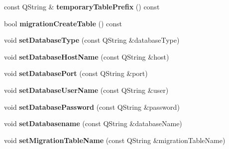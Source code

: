 \begin{DoxyCompactItemize}
const Q\+String \& {\bfseries temporary\+Table\+Prefix} () const
\item 
\mbox{\label{class_q_sql_migrator_1_1_q_sql_migrator_config_a8f70fad7d7e0b80be87b8756aa73f079}} 
bool {\bfseries migration\+Create\+Table} () const
\item 
\mbox{\label{class_q_sql_migrator_1_1_q_sql_migrator_config_a32383ed8cdf4ebe9da665ea654b5086b}} 
void {\bfseries set\+Database\+Type} (const Q\+String \&database\+Type)
\item 
\mbox{\label{class_q_sql_migrator_1_1_q_sql_migrator_config_acba327b341730f6b1a3e372846c77b4d}} 
void {\bfseries set\+Database\+Host\+Name} (const Q\+String \&host)
\item 
\mbox{\label{class_q_sql_migrator_1_1_q_sql_migrator_config_a192871d90c735da5e68502d0f7692a57}} 
void {\bfseries set\+Database\+Port} (const Q\+String \&port)
\item 
\mbox{\label{class_q_sql_migrator_1_1_q_sql_migrator_config_aad277041a5556989d030dc1a5f6524d7}} 
void {\bfseries set\+Database\+User\+Name} (const Q\+String \&user)
\item 
\mbox{\label{class_q_sql_migrator_1_1_q_sql_migrator_config_a1b0255eea4717e381e2669e336427ef0}} 
void {\bfseries set\+Database\+Password} (const Q\+String \&password)
\item 
\mbox{\label{class_q_sql_migrator_1_1_q_sql_migrator_config_a76bd5ba5b892566aa9fb4a78512bcc58}} 
void {\bfseries set\+Databasename} (const Q\+String \&database\+Name)
\item 
\mbox{\label{class_q_sql_migrator_1_1_q_sql_migrator_config_a331650b331c53cc1d2cd2249f8703090}} 
void {\bfseries set\+Migration\+Table\+Name} (const Q\+String \&migration\+Table\+Name)
\item 
\mbox{\label{class_q_sql_migrator_1_1_q_sql_migrator_config_a0c2854c31aec63ef34d4afd5f6abd0b4}} 

\end{DoxyCompactItemize}
